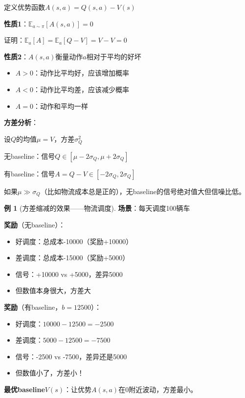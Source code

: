 \documentclass[11pt,a4paper]{article}
\theoremstyle{definition}
\newtheorem{example}{例}[section]
\begin{document}
\begin{keypoint}[Advantage函数与方差缩减]
定义优势函数$A(s,a) = Q(s,a) - V(s)$

\textbf{性质1}：$\mathbb{E}_{a \sim \pi}[A(s,a)] = 0$

证明：$\mathbb{E}_a[A] = \mathbb{E}_a[Q - V] = V - V = 0$

\textbf{性质2}：$A(s,a)$衡量动作$a$相对于平均的好坏
\begin{itemize}
    \item $A > 0$：动作比平均好，应该增加概率
    \item $A < 0$：动作比平均差，应该减少概率
    \item $A = 0$：动作和平均一样
\end{itemize}

\textbf{方差分析}：

设$Q$的均值$\mu = V$，方差$\sigma_Q^2$

无baseline：信号$Q \in [\mu - 2\sigma_Q, \mu + 2\sigma_Q]$

有baseline：信号$A = Q - V \in [-2\sigma_Q, 2\sigma_Q]$

如果$\mu \gg \sigma_Q$（比如物流成本总是正的），无baseline的信号绝对值大但信噪比低。
\end{keypoint}

\begin{example}[方差缩减的效果——物流调度]
\textbf{场景}：每天调度100辆车

\textbf{奖励}（无baseline）：
\begin{itemize}
    \item 好调度：总成本-10000（奖励+10000）
    \item 差调度：总成本-15000（奖励+5000）
    \item 信号：+10000 vs +5000，差异5000
    \item 但数值本身很大，方差大
\end{itemize}

\textbf{奖励}（有baseline，$b = 12500$）：
\begin{itemize}
    \item 好调度：$10000 - 12500 = -2500$
    \item 差调度：$5000 - 12500 = -7500$
    \item 信号：-2500 vs -7500，差异还是5000
    \item 但数值小了，方差小！
\end{itemize}

\textbf{最优baseline}$V(s)$：让优势$A(s,a)$在0附近波动，方差最小。
\end{example}
\end{document}
